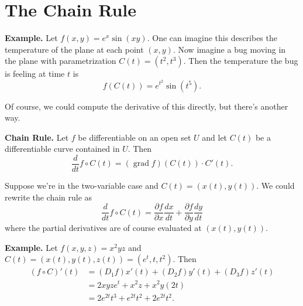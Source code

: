 \documentclass{article}
\DeclareMathOperator{\grd}{grad}
\begin{document}
\section*{The Chain Rule}

\textbf{Example.} Let $f(x,y) = e^x \sin(xy)$. One can imagine
this describes the temperature of the plane at each point $(x,y)$.
Now imagine a bug moving in the plane with parametrization
$C(t) = (t^2, t^3)$. Then the temperature the bug is feeling at time $t$
is 
\[f(C(t))=e^{t^2}\sin(t^5).\]

Of course, we could compute the derivative of this directly,
but there's another way.

\textbf{Chain Rule.} Let $f$ be differentiable on an open set $U$
and let $C(t)$ be a differentiable curve contained in $U$. Then 
\[\frac{d}{dt} f\circ C(t) = (\grd f)(C(t)) \cdot C'(t).\]

Suppose we're in the two-variable case and 
$C(t) = (x(t),y(t))$. We could rewrite the chain rule as
\[\frac{d}{dt} f\circ C(t) = \frac{\partial f}{\partial x} \frac{dx}{dt} + \frac{\partial f}{\partial y} \frac{dy}{dt}\]
where the partial derivatives are of course evaluated at $(x(t),y(t))$.

\textbf{Example.} Let $f(x,y,z) = x^2 y z$ and 
$C(t) = (x(t),y(t),z(t)) = (e^t, t, t^2)$.
Then 
\begin{align*}
(f\circ C)'(t) &= (D_1 f) x'(t) + (D_2 f) y'(t) + (D_3 f) z'(t)\\
&= 2xyz e^t + x^2 z  + x^2 y (2t)\\
&= 2e^{2t} t^3 + e^{2t} t^2 + 2e^{2t} t^2.
\end{align*}
\end{document}
